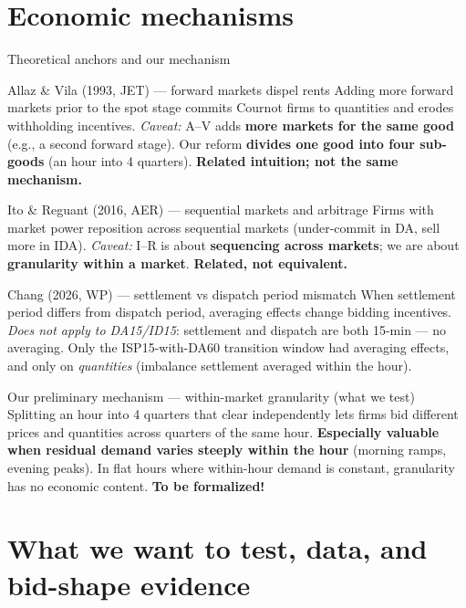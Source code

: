 \documentclass[10pt,aspectratio=169]{beamer}
\begin{document}
\section{Economic mechanisms}

\begin{frame}{Theoretical anchors and our mechanism}
  \footnotesize
  \begin{block}{Allaz \& Vila (1993, JET) --- forward markets dispel rents}
    Adding more forward markets prior to the spot stage commits Cournot firms to quantities and erodes withholding incentives. \emph{Caveat:} A--V adds \textbf{more markets for the same good} (e.g., a second forward stage). Our reform \textbf{divides one good into four sub-goods} (an hour into 4 quarters). \textbf{Related intuition; not the same mechanism.}
  \end{block}
  \begin{block}{Ito \& Reguant (2016, AER) --- sequential markets and arbitrage}
    Firms with market power reposition across sequential markets (under-commit in DA, sell more in IDA). \emph{Caveat:} I--R is about \textbf{sequencing across markets}; we are about \textbf{granularity within a market}. \textbf{Related, not equivalent.}
  \end{block}
  \begin{block}{Chang (2026, WP) --- settlement vs dispatch period mismatch}
    When settlement period differs from dispatch period, averaging effects change bidding incentives. \emph{Does not apply to DA15/ID15}: settlement and dispatch are both 15-min --- no averaging. Only the ISP15-with-DA60 transition window had averaging effects, and only on \emph{quantities} (imbalance settlement averaged within the hour).
  \end{block}
  \begin{block}{Our preliminary mechanism --- within-market granularity (what we test)}
    Splitting an hour into 4 quarters that clear independently lets firms bid different prices and quantities across quarters of the same hour. \textbf{Especially valuable when residual demand varies steeply within the hour} (morning ramps, evening peaks). In flat hours where within-hour demand is constant, granularity has no economic content. \textbf{To be formalized!}
  \end{block}
\end{frame}


\section{What we want to test, data, and bid-shape evidence}
\end{document}
